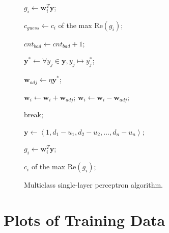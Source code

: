 \documentclass[twoside]{IEEEtran}
\begin{document}
\begin{figure}[!t]
\begin{algorithm}[H]
\begin{algorithmic}
                        \State%
                        \( g_i \gets \mathbf{w}_i^T \mathbf{y} \);
                    \EndFor%

                    \State%
                    \( c_{guess} \gets c_i \) of the max \( \mathrm{Re}\left(g_i\right) \);

                        \State%
                        \( cnt_{bad} \gets cnt_{bad} + 1 \);

                        \State%
                        \( \mathbf{y}^* \gets \forall y_j \in \mathbf{y}, y_j \mapsto y_j^* \);

                        \State%
                        \( \mathbf{w}_{adj} \gets \eta \mathbf{y}^* \);


                                \State%
                                \( \mathbf{w}_i \gets \mathbf{w}_i + \mathbf{w}_{adj} \);
                            \Else%
                                \State%
                                \( \mathbf{w}_i \gets \mathbf{w}_i - \mathbf{w}_{adj} \);
                            \EndIf%
                        \EndFor%
                    \EndIf%
                \EndFor%

                    \State%
                    break;
                \EndIf%
            \EndFor%

            \State{}

            \State%
            \( \mathbf{y} \gets \left<1, d_1 - u_1, d_2 - u_2, \dots, d_n - u_n\right> \);

                \State%
                \( g_i \gets \mathbf{w}_i^T \mathbf{y} \);
            \EndFor%

            \State\Return%
            \( c_i \) of the max \( \mathrm{Re}\left(g_i\right) \);
        \end{algorithmic}
    \end{algorithm}

    \caption{Multiclass single-layer perceptron algorithm.}%
    \label{slp}
\end{figure}

\section{Plots of Training Data}%
\label{train_data_plots}
\end{document}
